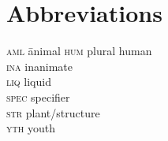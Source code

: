 \documentclass[output=paper,modfonts,nonflat]{langsci/langscibook}
\begin{document}
\section*{Abbreviations}
\begin{multicols}{2}
	\begin{tabbing}
		\textsc{aml}\hspace{1em} \= animal \kill
		\textsc{hum} \> plural human \\
		\textsc{ina} \> inanimate \\
		\textsc{liq} \> liquid \\
		\textsc{spec} \> specifier \\ 
		\textsc{str} \> plant/structure \\
		\textsc{yth} \> youth \\
	\end{tabbing}
\end{multicols}

{\sloppy
\printbibliography[heading=subbibliography,notkeyword=this]
}
\end{document}
